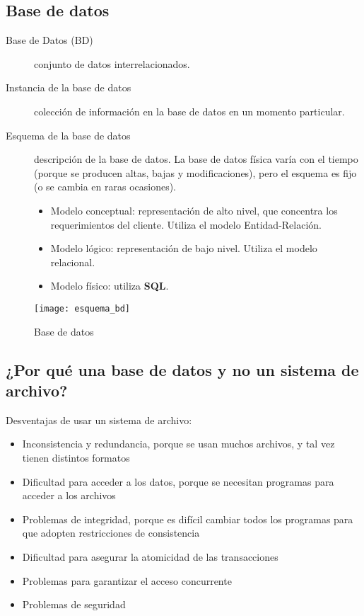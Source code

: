 \documentclass[a4paper, twoside]{article}
\begin{document}
\subsection{Base de datos}
\begin{description}
	\item[Base de Datos (BD)] conjunto de datos interrelacionados.
	\item[Instancia de la base de datos] colección de información en la base de datos en un momento particular.
	\item[Esquema de la base de datos] descripción de la base de datos. La base de datos física varía con el tiempo (porque se producen altas, bajas y modificaciones), pero el esquema es fijo (o se cambia en raras ocasiones).
	\begin{itemize}
		\item Modelo conceptual: representación de alto nivel, que concentra los requerimientos del cliente. Utiliza el modelo Entidad-Relación.
		\item Modelo lógico: representación de bajo nivel. Utiliza el modelo relacional.
		\item Modelo físico: utiliza \textbf{SQL}.
	\end{itemize}
\end{description}

\begin{figure}[H]
	\centering
	\texttt{[image: esquema\_bd]}
	\caption{Base de datos}
\end{figure}

\subsection{¿Por qué una base de datos y no un sistema de archivo?}
Desventajas de usar un sistema de archivo:
\begin{itemize}
	\item Inconsistencia y redundancia, porque se usan muchos archivos, y tal vez tienen distintos formatos
	\item Dificultad para acceder a los datos, porque se necesitan programas para acceder a los archivos
	\item Problemas de integridad, porque es difícil cambiar todos los programas para que adopten restricciones de consistencia
	\item Dificultad para asegurar la atomicidad de las transacciones
	\item Problemas para garantizar el acceso concurrente
	\item Problemas de seguridad
\end{itemize}
\end{document}
